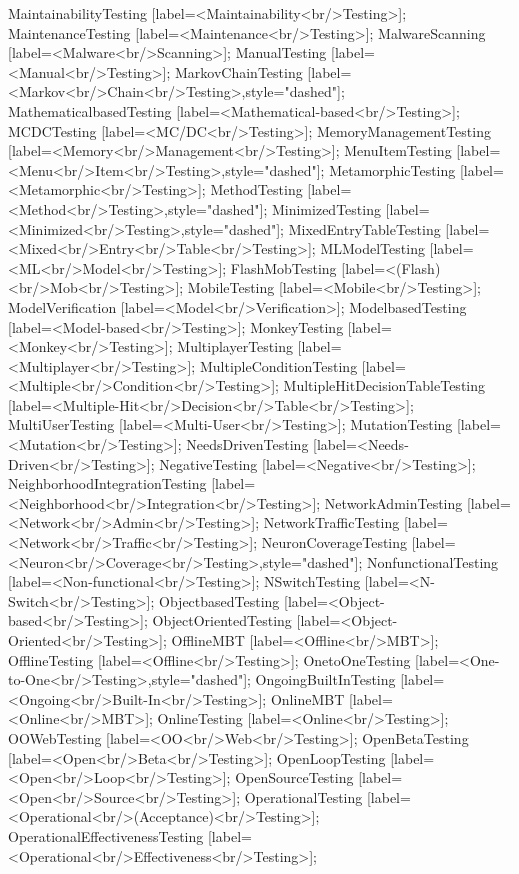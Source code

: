 \documentclass{article}
\begin{document}
{MaintainabilityTesting [label=<Maintainability<br/>Testing>];
MaintenanceTesting [label=<Maintenance<br/>Testing>];
MalwareScanning [label=<Malware<br/>Scanning>];
ManualTesting [label=<Manual<br/>Testing>];
MarkovChainTesting [label=<Markov<br/>Chain<br/>Testing>,style="dashed"];
MathematicalbasedTesting [label=<Mathematical-based<br/>Testing>];
MCDCTesting [label=<MC/DC<br/>Testing>];
MemoryManagementTesting [label=<Memory<br/>Management<br/>Testing>];
MenuItemTesting [label=<Menu<br/>Item<br/>Testing>,style="dashed"];
MetamorphicTesting [label=<Metamorphic<br/>Testing>];
MethodTesting [label=<Method<br/>Testing>,style="dashed"];
MinimizedTesting [label=<Minimized<br/>Testing>,style="dashed"];
MixedEntryTableTesting [label=<Mixed<br/>Entry<br/>Table<br/>Testing>];
MLModelTesting [label=<ML<br/>Model<br/>Testing>];
FlashMobTesting [label=<(Flash)<br/>Mob<br/>Testing>];
MobileTesting [label=<Mobile<br/>Testing>];
ModelVerification [label=<Model<br/>Verification>];
ModelbasedTesting [label=<Model-based<br/>Testing>];
MonkeyTesting [label=<Monkey<br/>Testing>];
MultiplayerTesting [label=<Multiplayer<br/>Testing>];
MultipleConditionTesting [label=<Multiple<br/>Condition<br/>Testing>];
MultipleHitDecisionTableTesting [label=<Multiple-Hit<br/>Decision<br/>Table<br/>Testing>];
MultiUserTesting [label=<Multi-User<br/>Testing>];
MutationTesting [label=<Mutation<br/>Testing>];
NeedsDrivenTesting [label=<Needs-Driven<br/>Testing>];
NegativeTesting [label=<Negative<br/>Testing>];
NeighborhoodIntegrationTesting [label=<Neighborhood<br/>Integration<br/>Testing>];
NetworkAdminTesting [label=<Network<br/>Admin<br/>Testing>];
NetworkTrafficTesting [label=<Network<br/>Traffic<br/>Testing>];
NeuronCoverageTesting [label=<Neuron<br/>Coverage<br/>Testing>,style="dashed"];
NonfunctionalTesting [label=<Non-functional<br/>Testing>];
NSwitchTesting [label=<N-Switch<br/>Testing>];
ObjectbasedTesting [label=<Object-based<br/>Testing>];
ObjectOrientedTesting [label=<Object-Oriented<br/>Testing>];
OfflineMBT [label=<Offline<br/>MBT>];
OfflineTesting [label=<Offline<br/>Testing>];
OnetoOneTesting [label=<One-to-One<br/>Testing>,style="dashed"];
OngoingBuiltInTesting [label=<Ongoing<br/>Built-In<br/>Testing>];
OnlineMBT [label=<Online<br/>MBT>];
OnlineTesting [label=<Online<br/>Testing>];
OOWebTesting [label=<OO<br/>Web<br/>Testing>];
OpenBetaTesting [label=<Open<br/>Beta<br/>Testing>];
OpenLoopTesting [label=<Open<br/>Loop<br/>Testing>];
OpenSourceTesting [label=<Open<br/>Source<br/>Testing>];
OperationalTesting [label=<Operational<br/>(Acceptance)<br/>Testing>];
OperationalEffectivenessTesting [label=<Operational<br/>Effectiveness<br/>Testing>];
}
\end{document}
